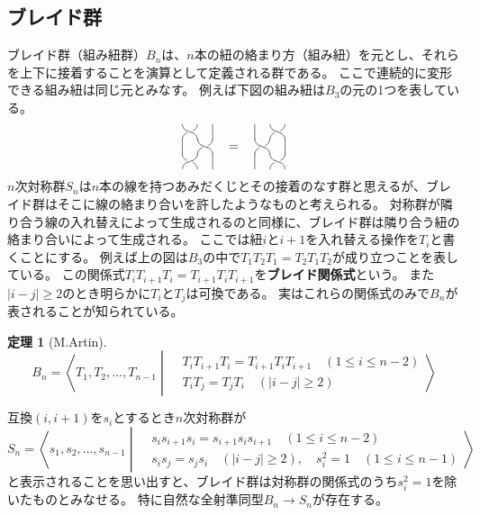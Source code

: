 \documentclass[uplatex,11pt,a4paper,dvipdfmx]{jsarticle}
\numberwithin{equation}{section}
\theoremstyle{definition}
\newtheorem{theorem}{定理}[section]
\begin{document}
\subsection{ブレイド群}
ブレイド群（組み紐群）$B_n$は、$n$本の紐の絡まり方（組み紐）を元とし、それらを上下に接着することを演算として定義される群である。
ここで連続的に変形できる組み紐は同じ元とみなす。
例えば下図の組み紐は$B_3$の元の1つを表している。
\[
    \vcenter{\xy 0;/r1pc/:
    @={(0.5,-0.5),(0,0)}, @@{*{\vtwistneg}},(0,-2),\vtwist,
    @i@={(0,-1),(2,0),(2,-2)} @@{="save";"save"-(0,1),**@{-}}\endxy}
    \quad = \quad
    \vcenter{\xy 0;/r1pc/:
    @={(0.5,0),(0,-0.5),(0.5,-1)}, @@{*{\vtwistneg}},
    @i@={(0,0),(2,-1),(0,-2)} @@{="save";"save"-(0,1),**@{-}}\endxy}
\]
$n$次対称群$S_n$は$n$本の線を持つあみだくじとその接着のなす群と思えるが、ブレイド群はそこに線の絡まり合いを許したようなものと考えられる。
対称群が隣り合う線の入れ替えによって生成されるのと同様に、ブレイド群は隣り合う紐の絡まり合いによって生成される。
ここでは紐$i$と$i+1$を入れ替える操作を$T_i$と書くことにする。
例えば上の図は$B_3$の中で$T_1T_2T_1 = T_2T_1T_2$が成り立つことを表している。
この関係式$T_iT_{i+1}T_i = T_{i+1}T_iT_{i+1}$を\textbf{ブレイド関係式}という。
また$|i-j| \geq 2$のとき明らかに$T_i$と$T_j$は可換である。
実はこれらの関係式のみで$B_n$が表されることが知られている。
\begin{theorem}[M.Artin]\label{thm:braid-group-as-artin-group}
    \begin{equation}
        B_n = \left\langle T_1, T_2, \dots, T_{n-1} \middle| \begin{split}
              &T_iT_{i+1}T_i = T_{i+1}T_iT_{i+1} \quad(1\leq i \leq n-2)\\
              &T_iT_j = T_jT_i\quad (|i-j| \geq 2)
          \end{split}\right\rangle
    \end{equation}
\end{theorem}
互換$(i, i+1)$を$s_i$とするとき$n$次対称群が
\begin{equation}
    S_n = \left\langle s_1, s_2, \dots, s_{n-1} \middle| \begin{split}
          &s_is_{i+1}s_i = s_{i+1}s_is_{i+1} \quad(1\leq i \leq n-2)\\
          &s_is_j = s_js_i\quad (|i-j| \geq 2), \quad s_i^2 = 1 \quad (1 \leq i \leq n-1)
      \end{split}\right\rangle
\end{equation}
と表示されることを思い出すと、ブレイド群は対称群の関係式のうち$s_i^2 = 1$を除いたものとみなせる。
特に自然な全射準同型$B_n \to S_n$が存在する。
\end{document}
